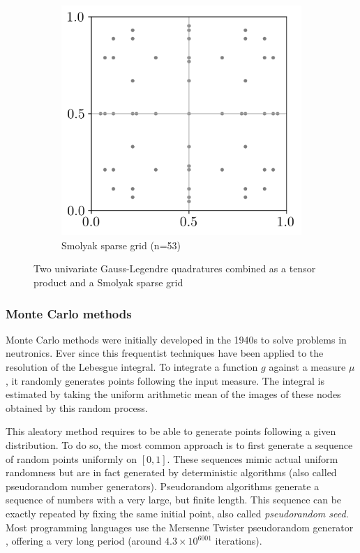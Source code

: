 \begin{figure}[h!]
\begin{subfigure}[b]{0.32\textwidth}
        \includegraphics[width=\textwidth]{../numerical_experiments/chapter1/figures/smolyak_gaussian_quadrature.png}
        \caption{Smolyak sparse grid (n=53)}
    \end{subfigure}
    \caption{Two univariate Gauss-Legendre quadratures combined as a tensor product and a Smolyak sparse grid}
    \label{fig:bivariate_quads}
\end{figure}


\subsubsection{Monte Carlo methods}
Monte Carlo methods were initially developed in the 1940s to solve problems in neutronics.  
Ever since this frequentist techniques have been applied to the resolution of the Lebesgue integral. 
To integrate a function $g$ against a measure $\mu$, it randomly generates points following the input measure. 
The integral is estimated by taking the uniform arithmetic mean of the images of these nodes obtained by this random process. 

This aleatory method requires to be able to generate points following a given distribution. 
To do so, the most common approach is to first generate a sequence of random points uniformly on $[0, 1]$. 
These sequences mimic actual uniform randomness but are in fact generated by deterministic algorithms (also called pseudorandom number generators).
Pseudorandom algorithms generate a sequence of numbers with a very large, but finite length. 
This sequence can be exactly repeated by fixing the same initial point, also called \textit{pseudorandom seed}.
Most programming languages use the Mersenne Twister pseudorandom generator \citep{matsumoto_1998}, offering a very long period (around $4.3\times10^{6001}$ iterations).

